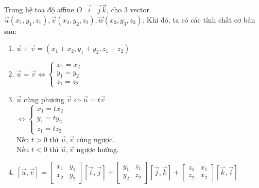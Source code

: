 \documentclass[12pt,a4]{article}
\begin{document}
\begin{titlepage}
\begin{enumerate}
\begin{center}
    \end{center}
    Trong hệ toạ độ affine $O\textbf{ }\vec{i}\textbf{ }\vec{j}\vec{k}$, cho 3 vector $\vec{u}(x_1,y_1,z_1), \vec{v}(x_2,y_2,z_2), \vec{w}(x_3,y_3,z_3).$ Khi đó, ta có các tính chất cơ bản sau:
    \begin{enumerate}
        \item $\vec{u} + \vec{v} = (x_1 + x_2,y_1 + y_2,z_1 + z_2)$
        \item $\vec{u} = \vec{v} \Leftrightarrow \begin{cases} x_1 = x_2 \\ y_1 = y_2\\ z_1 = z_2\end{cases}$
        \item $\vec{u}$ cùng phương $\vec{v} \Leftrightarrow \vec{u} = t\vec{v}$\\
        $\Leftrightarrow \begin{cases} x_1 = tx_2 \\ y_1 = ty_2 \\ z_1 = tz_2\end{cases}$\\
        Nếu $t > 0$ thì $\vec{u}, \vec{v}$ cùng ngược.\\
        Nếu $t < 0$ thì $\vec{u}, \vec{v}$ ngược hướng.\\
        \item $[\vec{u},\vec{v}] = \begin{bmatrix} x_1 & y_1 \\ x_2 & y_2\end{bmatrix}[\vec{i},\vec{j}] + \begin{bmatrix} y_1 & z_1 \\ y_2 & z_2\end{bmatrix}[\vec{j}, \vec{k}] + \begin{bmatrix}z_1 & x_1\\ z_2 & x_2 \end{bmatrix}[\vec{k},\vec{i}]$

\end{enumerate}
\end{enumerate}
\end{titlepage}
\end{document}

